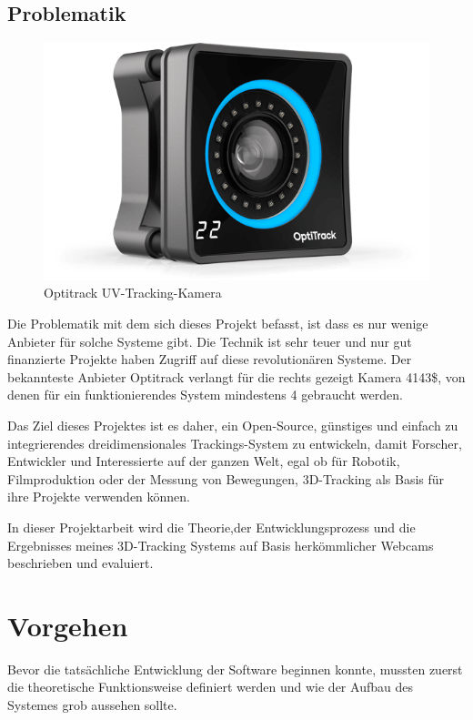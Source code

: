 \documentclass[12pt]{article}
\begin{document}
\subsection{Problematik}
\begin{figure}
\centering
  {\setlength{\belowcaptionskip}{-10pt}
    \includegraphics[angle=0,width=\linewidth]{4143.png}
    \caption{Optitrack UV-Tracking-Kamera}
  }
\end{figure}
Die Problematik mit dem sich dieses Projekt befasst, ist dass es nur wenige Anbieter für solche Systeme gibt. Die Technik ist sehr teuer und nur gut finanzierte Projekte haben Zugriff auf diese revolutionären Systeme. Der bekannteste Anbieter Optitrack verlangt für die rechts gezeigt Kamera 4143\$, von denen für ein funktionierendes System mindestens 4 gebraucht werden. 

Das Ziel dieses Projektes ist es daher, ein Open-Source, günstiges und einfach zu integrierendes dreidimensionales Trackings-System zu entwickeln, damit Forscher, Entwickler und Interessierte auf der ganzen Welt, egal ob für Robotik, Filmproduktion oder der Messung von Bewegungen, 3D-Tracking als Basis für ihre Projekte verwenden können. \par
In dieser Projektarbeit wird die Theorie,der Entwicklungsprozess und die Ergebnisses meines 3D-Tracking Systems auf Basis herkömmlicher Webcams beschrieben und evaluiert.  

\newpage
\section{Vorgehen}
Bevor die tatsächliche Entwicklung der Software beginnen konnte, mussten zuerst die theoretische Funktionsweise definiert werden und wie der Aufbau des Systemes grob aussehen sollte.
\end{document}
